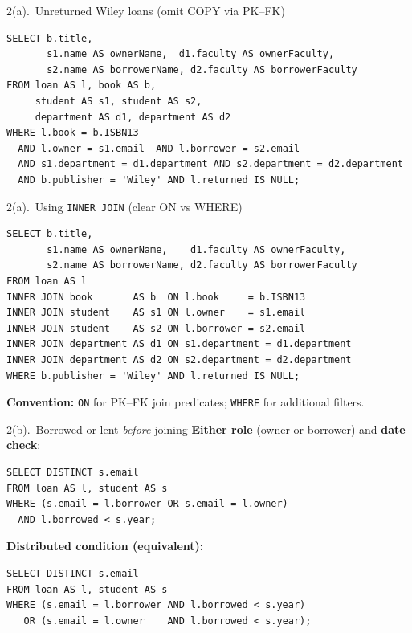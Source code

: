 \documentclass{beamer}
\begin{document}
\begin{frame}[fragile]{2(a).\ Unreturned Wiley loans (omit COPY via PK–FK)}
\small
\begin{lstlisting}[style=sqlcompact]
SELECT b.title,
       s1.name AS ownerName,  d1.faculty AS ownerFaculty,
       s2.name AS borrowerName, d2.faculty AS borrowerFaculty
FROM loan AS l, book AS b,
     student AS s1, student AS s2,
     department AS d1, department AS d2
WHERE l.book = b.ISBN13
  AND l.owner = s1.email  AND l.borrower = s2.email
  AND s1.department = d1.department AND s2.department = d2.department
  AND b.publisher = 'Wiley' AND l.returned IS NULL;
\end{lstlisting}
\end{frame}

\begin{frame}[fragile]{2(a).\ Using \texttt{INNER JOIN} (clear ON vs WHERE)}
\small
\begin{lstlisting}[style=sqlcompact]
SELECT b.title,
       s1.name AS ownerName,    d1.faculty AS ownerFaculty,
       s2.name AS borrowerName, d2.faculty AS borrowerFaculty
FROM loan AS l
INNER JOIN book       AS b  ON l.book     = b.ISBN13
INNER JOIN student    AS s1 ON l.owner    = s1.email
INNER JOIN student    AS s2 ON l.borrower = s2.email
INNER JOIN department AS d1 ON s1.department = d1.department
INNER JOIN department AS d2 ON s2.department = d2.department
WHERE b.publisher = 'Wiley' AND l.returned IS NULL;
\end{lstlisting}
\textbf{Convention:} \texttt{ON} for PK–FK join predicates; \texttt{WHERE} for additional filters.
\end{frame}

\begin{frame}[fragile]{2(b).\ Borrowed or lent \emph{before} joining}
\small
\textbf{Either role} (owner or borrower) and \textbf{date check}:
\begin{lstlisting}
SELECT DISTINCT s.email
FROM loan AS l, student AS s
WHERE (s.email = l.borrower OR s.email = l.owner)
  AND l.borrowed < s.year;
\end{lstlisting}
\textbf{Distributed condition (equivalent):}
\begin{lstlisting}
SELECT DISTINCT s.email
FROM loan AS l, student AS s
WHERE (s.email = l.borrower AND l.borrowed < s.year)
   OR (s.email = l.owner    AND l.borrowed < s.year);
\end{lstlisting}
\end{frame}
\end{document}
